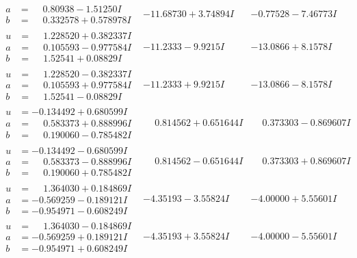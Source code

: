 \documentclass[1p]{elsarticle_modified}
\theoremstyle{definition}
\begin{document}
$$\begin{array}{c|c|c}
\begin{aligned}
a &= \phantom{-}0.80938 - 1.51250 I \\
b &= \phantom{-}0.332578 + 0.578978 I\end{aligned}
 & -11.68730 + 3.74894 I & -0.77528 - 7.46773 I \\ \hline\begin{aligned}
u &= \phantom{-}1.228520 + 0.382337 I \\
a &= \phantom{-}0.105593 - 0.977584 I \\
b &= \phantom{-}1.52541 + 0.08829 I\end{aligned}
 & -11.2333 - 9.9215 I & -13.0866 + 8.1578 I \\ \hline\begin{aligned}
u &= \phantom{-}1.228520 - 0.382337 I \\
a &= \phantom{-}0.105593 + 0.977584 I \\
b &= \phantom{-}1.52541 - 0.08829 I\end{aligned}
 & -11.2333 + 9.9215 I & -13.0866 - 8.1578 I \\ \hline\begin{aligned}
u &= -0.134492 + 0.680599 I \\
a &= \phantom{-}0.583373 + 0.888996 I \\
b &= \phantom{-}0.190060 - 0.785482 I\end{aligned}
 & \phantom{-}0.814562 + 0.651644 I & \phantom{-}0.373303 - 0.869607 I \\ \hline\begin{aligned}
u &= -0.134492 - 0.680599 I \\
a &= \phantom{-}0.583373 - 0.888996 I \\
b &= \phantom{-}0.190060 + 0.785482 I\end{aligned}
 & \phantom{-}0.814562 - 0.651644 I & \phantom{-}0.373303 + 0.869607 I \\ \hline\begin{aligned}
u &= \phantom{-}1.364030 + 0.184869 I \\
a &= -0.569259 - 0.189121 I \\
b &= -0.954971 - 0.608249 I\end{aligned}
 & -4.35193 - 3.55824 I & -4.00000 + 5.55601 I \\ \hline\begin{aligned}
u &= \phantom{-}1.364030 - 0.184869 I \\
a &= -0.569259 + 0.189121 I \\
b &= -0.954971 + 0.608249 I\end{aligned}
 & -4.35193 + 3.55824 I & -4.00000 - 5.55601 I \\ \hline\begin{aligned}

\end{aligned}
\end{array}$$
\end{document}
